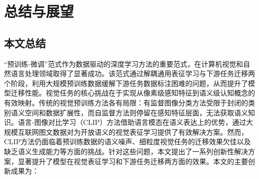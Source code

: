 \chapter{总结与展望}
\label{cha:summary}
\section{本文总结}
“预训练-微调”范式作为数据驱动的深度学习方法的重要范式，在计算机视觉和自然语言处理领域取得了显著成功。该范式通过解耦通用表征学习与下游任务迁移两个阶段，利用大规模预训练数据缓解下游任务数据标注困难的问题，从而提升了模型迁移性能。视觉任务的核心挑战在于实现从像素级感知特征到语义级认知概念的有效映射。传统的视觉预训练方法各有局限：有监督图像分类方法受限于封闭的类别语义空间和数据扩展性，而自监督方法则停留在感知特征层面，无法获取语义知识。语言-图像对比学习（CLIP）方法借助语言模态在语义表达上的优势，通过大规模互联网图文数据对为开放语义的视觉表征学习提供了有效解决方案。然而，CLIP方法仍面临着预训练数据的语义噪声、细粒度视觉任务的迁移效果欠佳以及缺乏语义生成能力等方面的挑战。针对这些问题，本文提出了一系列创新性解决方案，显著提升了模型在视觉表征学习和下游任务迁移两方面的效果。本文的主要创新成果为：

